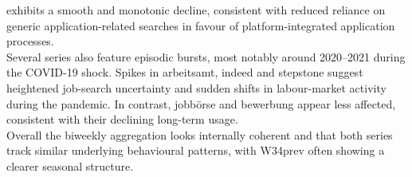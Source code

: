 \documentclass[12pt,a4paper]{article}
\begin{document}
exhibits a smooth and monotonic decline, consistent with reduced reliance on generic 
application-related searches in favour of platform-integrated application processes.\\
Several series also feature episodic bursts, most notably around 2020--2021 during the 
COVID-19 shock. Spikes in arbeitsamt, indeed and stepstone
suggest heightened job-search uncertainty and sudden shifts in labour-market activity 
during the pandemic. In contrast, jobbörse and bewerbung appear less 
affected, consistent with their declining long-term usage.\\
Overall the biweekly aggregation looks internally coherent and that both series track similar underlying behavioural patterns, with W34prev often showing a clearer seasonal structure.
\end{document}
